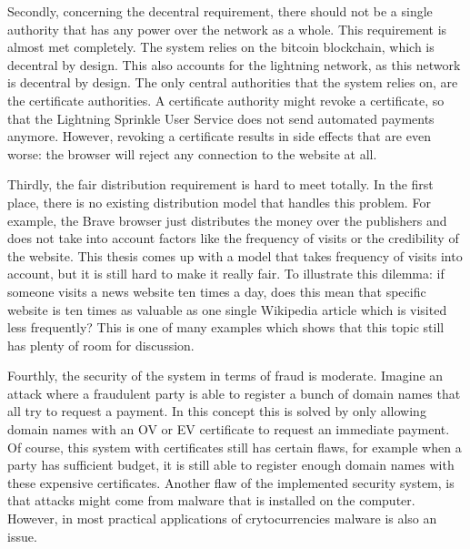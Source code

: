 Secondly, concerning the decentral requirement, there should not be a single authority that has any power over the network as a whole. This requirement is almost met completely. The system relies on the bitcoin blockchain, which is decentral by design. This also accounts for the lightning network, as this network is decentral by design. The only central authorities that the system relies on, are the certificate authorities. A certificate authority might revoke a certificate, so that the Lightning Sprinkle User Service does not send automated payments anymore. However, revoking a certificate results in side effects that are even worse: the browser will reject any connection to the website at all.

Thirdly, the fair distribution requirement is hard to meet totally. In the first place, there is no existing distribution model that handles this problem. For example, the Brave browser just distributes the money over the publishers and does not take into account factors like the frequency of visits or the credibility of the website. This thesis comes up with a model that takes frequency of visits into account, but it is still hard to make it really fair. To illustrate this dilemma: if someone visits a news website ten times a day, does this mean that specific website is ten times as valuable as one single Wikipedia article which is visited less frequently? This is one of many examples which shows that this topic still has plenty of room for discussion. 


Fourthly, the security of the system in terms of fraud is moderate. Imagine an attack where a fraudulent party is able to register a bunch of domain names that all try to request a payment. In this concept this is solved by only allowing domain names with an OV or EV certificate to request an immediate payment. Of course, this system with certificates still has certain flaws, for example when a party has sufficient budget, it is still able to register enough domain names with these expensive certificates. Another flaw of the implemented security system, is that attacks might come from malware that is installed on the computer. However, in most practical applications of crytocurrencies malware is also an issue.

